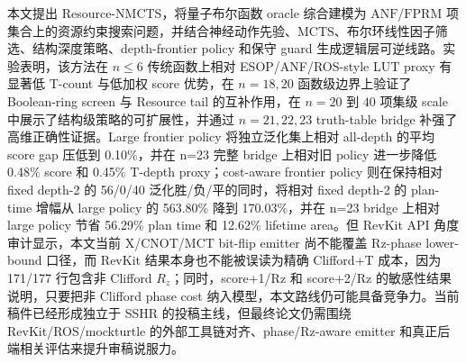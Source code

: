 \documentclass[UTF8,fontset=macnew,11pt]{ctexart}
\newcommand{\method}{Resource-NMCTS}
\newcommand{\screen}{Boolean-ring screen}
\newcommand{\anf}{\ensuremath{\mathrm{ANF}}}
\newcommand{\fprm}{\ensuremath{\mathrm{FPRM}}}
\newcommand{\mcts}{\ensuremath{\mathrm{MCTS}}}
\newcommand{\mct}{\ensuremath{\mathrm{MCT}}}
\begin{document}
本文提出 \method{}，将量子布尔函数 oracle 综合建模为 \anf{}/\fprm{} 项集合上的资源约束搜索问题，并结合神经动作先验、\mcts{}、布尔环线性因子筛选、结构深度策略、depth-frontier policy 和保守 guard 生成逻辑层可逆线路。实验表明，该方法在 $n\leq6$ 传统函数上相对 ESOP/ANF/ROS-style LUT proxy 有显著低 T-count 与低加权 score 优势，在 $n=18,20$ 函数级边界上验证了 \screen{} 与 Resource tail 的互补作用，在 $n=20$ 到 $40$ 项集级 scale 中展示了结构级策略的可扩展性，并通过 $n=21,22,23$ truth-table bridge 补强了高维正确性证据。Large frontier policy 将独立泛化集上相对 all-depth 的平均 score gap 压低到 0.10\%，并在 n=23 完整 bridge 上相对旧 policy 进一步降低 0.48\% score 和 0.45\% T-depth proxy；cost-aware frontier policy 则在保持相对 fixed depth-2 的 56/0/40 泛化胜/负/平的同时，将相对 fixed depth-2 的 plan-time 增幅从 large policy 的 563.80\% 降到 170.03\%，并在 n=23 bridge 上相对 large policy 节省 56.29\% plan time 和 12.62\% lifetime area。但 RevKit API 角度审计显示，本文当前 X/CNOT/\mct{} bit-flip emitter 尚不能覆盖 Rz-phase lower-bound 口径，而 RevKit 结果本身也不能被误读为精确 Clifford+T 成本，因为 171/177 行包含非 Clifford $R_z$；同时，score+1/Rz 和 score+2/Rz 的敏感性结果说明，只要把非 Clifford phase cost 纳入模型，本文路线仍可能具备竞争力。当前稿件已经形成独立于 SSHR 的投稿主线，但最终论文仍需围绕 RevKit/ROS/mockturtle 的外部工具链对齐、phase/Rz-aware emitter 和真正后端相关评估来提升审稿说服力。
\end{document}
